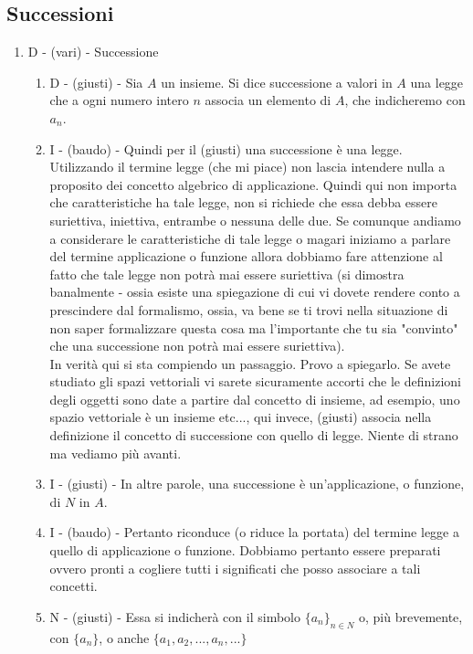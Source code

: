 \documentclass[]{article}
\begin{document}
\subsection{Successioni}
\begin{enumerate}
	\item D - (vari) - Successione 
	      \begin{enumerate}
		    \item D - (giusti) - Sia $A$ un insieme. Si dice successione a valori in $A$ una legge che a ogni numero intero $n$ associa un elemento di $A$, che indicheremo con $a_n$. 
		    
		    \item I - (baudo) - Quindi per il (giusti) una successione \`e una legge. Utilizzando il termine legge (che mi piace) non lascia intendere nulla a proposito dei concetto algebrico di applicazione. Quindi qui non importa che caratteristiche ha tale legge, non si richiede che essa debba essere suriettiva, iniettiva, entrambe o nessuna delle due. Se comunque andiamo a considerare le caratteristiche di tale legge o magari iniziamo a parlare del termine applicazione o funzione allora dobbiamo fare attenzione al fatto che tale legge non potr\`a mai essere suriettiva (si dimostra banalmente - ossia esiste una spiegazione di cui vi dovete rendere conto a prescindere dal formalismo, ossia, va bene se ti trovi nella situazione di non saper formalizzare questa cosa ma l'importante che tu sia "convinto" che una successione non potr\`a mai essere suriettiva). \\
		    In verit\`a qui si sta compiendo un passaggio. Provo a spiegarlo. Se avete studiato gli spazi vettoriali vi sarete sicuramente accorti che le definizioni degli oggetti sono date a partire dal concetto di insieme, ad esempio, uno spazio vettoriale \`e un insieme etc..., qui invece, (giusti) associa nella definizione il concetto di successione con quello di legge. Niente di strano ma vediamo pi\`u avanti. 
		    
		    \item I - (giusti) - In altre parole, una successione \`e un'applicazione, o funzione, di $N$ in $A$.
		    \item I - (baudo) - Pertanto riconduce (o riduce la portata) del termine legge a quello di applicazione o funzione. Dobbiamo pertanto essere preparati ovvero pronti a cogliere tutti i significati che posso associare a tali concetti.
		    
		    \item N - (giusti) - Essa si indicher\`a con il simbolo $\{a_n\}_{n \in N}$ o, pi\`u brevemente, con $\{a_n\}$, o anche $\{a_1, a_2,...,a_n,...\}$
		    

\end{enumerate}
\end{enumerate}
\end{document}
